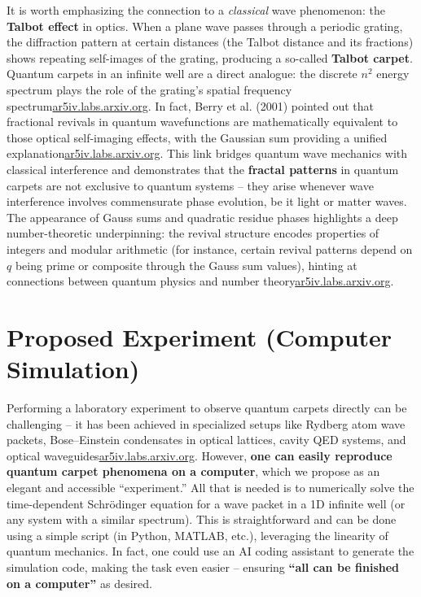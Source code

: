 \documentclass[11pt,a4paper]{article}
\begin{document}
It is worth emphasizing the connection to a \emph{classical} wave phenomenon: the \textbf{Talbot effect} in optics. When a plane wave passes through a periodic grating, the diffraction pattern at certain distances (the Talbot distance and its fractions) shows repeating self-images of the grating, producing a so-called \textbf{Talbot carpet}. Quantum carpets in an infinite well are a direct analogue: the discrete $n^2$ energy spectrum plays the role of the grating’s spatial frequency spectrum\href{https://ar5iv.labs.arxiv.org/html/1808.09708#:~:text=In fact%2C the same phenomenon,the help of Gaussian sum}{ar5iv.labs.arxiv.org}. In fact, Berry et al. (2001) pointed out that fractional revivals in quantum wavefunctions are mathematically equivalent to those optical self-imaging effects, with the Gaussian sum providing a unified explanation\href{https://ar5iv.labs.arxiv.org/html/1808.09708#:~:text=In fact%2C the same phenomenon,the help of Gaussian sum}{ar5iv.labs.arxiv.org}. This link bridges quantum wave mechanics with classical interference and demonstrates that the \textbf{fractal patterns} in quantum carpets are not exclusive to quantum systems – they arise whenever wave interference involves commensurate phase evolution, be it light or matter waves. The appearance of Gauss sums and quadratic residue phases highlights a deep number-theoretic underpinning: the revival structure encodes properties of integers and modular arithmetic (for instance, certain revival patterns depend on $q$ being prime or composite through the Gauss sum values), hinting at connections between quantum physics and number theory\href{https://ar5iv.labs.arxiv.org/html/1808.09708#:~:text=where is called as the,integer and %2C we have}{ar5iv.labs.arxiv.org}.

\section{Proposed Experiment (Computer Simulation)}

Performing a laboratory experiment to observe quantum carpets directly can be challenging – it has been achieved in specialized setups like Rydberg atom wave packets, Bose–Einstein condensates in optical lattices, cavity QED systems, and optical waveguides\href{https://ar5iv.labs.arxiv.org/html/1808.09708#:~:text=García et al,and so on}{ar5iv.labs.arxiv.org}. However, \textbf{one can easily reproduce quantum carpet phenomena on a computer}, which we propose as an elegant and accessible “experiment.” All that is needed is to numerically solve the time-dependent Schrödinger equation for a wave packet in a 1D infinite well (or any system with a similar spectrum). This is straightforward and can be done using a simple script (in Python, MATLAB, etc.), leveraging the linearity of quantum mechanics. In fact, one could use an AI coding assistant to generate the simulation code, making the task even easier – ensuring \textbf{“all can be finished on a computer”} as desired.
\end{document}
